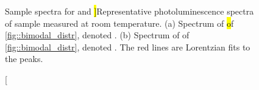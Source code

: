 	\begin{figure}[htp]
		\begin{subfigure}[tp]{0.45\linewidth}
			\centering
			\caption{}\label{subfig::emnarrow}
		\end{subfigure}
		\hfill
		\begin{subfigure}[tp]{0.45\linewidth}
			\centering
			\caption{}\label{subfig::embroad}
		\end{subfigure}
		\caption[Sample \siv \pl spectra for \vl and \hl]{Representative photoluminescence spectra of sample \insituHao measured at room temperature. (a) Spectrum of \hl of \autoref{fig::bimodal_distr}, denoted \emnarrow. (b) Spectrum of \vl of \autoref{fig::bimodal_distr}, denoted \embroad. The red lines are Lorentzian fits to the peaks.}
		\label{fig::spectra}
	\end{figure}

